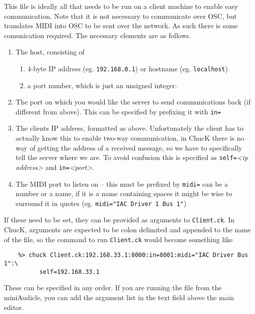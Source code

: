 \documentclass[../main.tex]{subfiles}
\begin{document}
This file is ideally all that needs to be run on a client machine to enable easy communication. Note that it is not necessary to communicate over OSC,
but translates MIDI into OSC to be sent over the network. As such there is some comunication required. The necessary elements are as follows.

\begin{enumerate} [\bf a)]
	\item The host, consisting of
	\begin{enumerate} [\bf i)]
		\item 4-byte IP address (eg. \texttt{192.168.0.1}) or hostname (eg. \texttt{localhost})
		\item a port number, which is just an unsigned integer.
	\end{enumerate}
	\item The port on which you would like the server to send communications back (if different from above). This can be specified by prefixing it with
		\texttt{in=}
	\item The clients IP address, formatted as above. Unfortunately the client has to actually know this to enable two-way communication, 
		in ChucK there is no way of getting the address of a received message, so we have to specifically tell the server where we are.
		To avoid confusion this is specified as \texttt{self=}\textit{<ip address>} and \texttt{in=}\textit{<port>}.
	\item The MIDI port to listen on -- this must be prefixed by \texttt{midi=} can be a number or a name, if it is a name containing spaces it might be
		 wise to surround it in quotes (eg. \texttt{midi="IAC Driver 1 Bus 1"})
		
\end{enumerate}
If these need to be set, they can be provided as arguments to \texttt{Client.ck}. In ChucK, arguments are expected to be colon delimited and appended
to the name of the file, so the command to run \texttt{Client.ck} would become something like 
\begin{verbatim}
    %> chuck Client.ck:192.168.33.1:8000:in=8001:midi="IAC Driver Bus 1":\
    	  self=192.168.33.1
\end{verbatim}
These can be specified in any order.
If you are running the file from the miniAudicle, you can add the argument list in the text field above the main editor.
\end{document}
